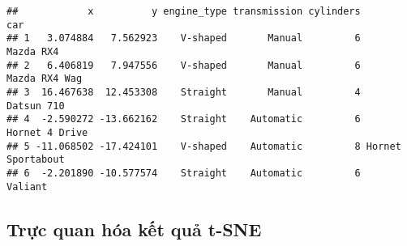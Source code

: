 \documentclass[
]{article}
\newenvironment{Shaded}{\begin{snugshade}}{\end{snugshade}}
\newcommand{\AttributeTok}[1]{\textcolor[rgb]{0.13,0.29,0.53}{#1}}
\newcommand{\CommentTok}[1]{\textcolor[rgb]{0.56,0.35,0.01}{\textit{#1}}}
\newcommand{\DecValTok}[1]{\textcolor[rgb]{0.00,0.00,0.81}{#1}}
\newcommand{\FunctionTok}[1]{\textcolor[rgb]{0.13,0.29,0.53}{\textbf{#1}}}
\newcommand{\NormalTok}[1]{#1}
\newcommand{\OtherTok}[1]{\textcolor[rgb]{0.56,0.35,0.01}{#1}}
\newcommand{\SpecialCharTok}[1]{\textcolor[rgb]{0.81,0.36,0.00}{\textbf{#1}}}
\begin{document}
\begin{Shaded}
\end{Shaded}

\begin{verbatim}
##            x          y engine_type transmission cylinders               car
## 1   3.074884   7.562923    V-shaped       Manual         6         Mazda RX4
## 2   6.406819   7.947556    V-shaped       Manual         6     Mazda RX4 Wag
## 3  16.467638  12.453308    Straight       Manual         4        Datsun 710
## 4  -2.590272 -13.662162    Straight    Automatic         6    Hornet 4 Drive
## 5 -11.068502 -17.424101    V-shaped    Automatic         8 Hornet Sportabout
## 6  -2.201890 -10.577574    Straight    Automatic         6           Valiant
\end{verbatim}

\subsection{Trực quan hóa kết quả
t-SNE}\label{trux1ef1c-quan-huxf3a-kux1ebft-quux1ea3-t-sne}
\end{document}
